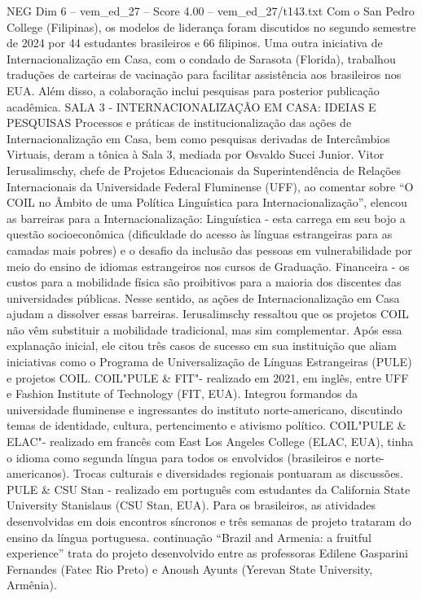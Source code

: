 \begin{textsample}{NEG Dim 6 – vem\_ed\_27 – Score 4.00 – vem\_ed\_27/t143.txt}
Com o San Pedro College (Filipinas), os modelos de liderança foram discutidos no segundo semestre de 2024 por 44 estudantes brasileiros e 66 filipinos.
Uma outra iniciativa de Internacionalização em Casa, com o condado de Sarasota (Florida), trabalhou traduções de carteiras de vacinação para facilitar assistência aos brasileiros nos EUA.
Além disso, a colaboração inclui pesquisas para posterior publicação acadêmica.
SALA 3 - INTERNACIONALIZAÇÃO EM CASA: IDEIAS E PESQUISAS Processos e práticas de institucionalização das ações de Internacionalização em Casa, bem como pesquisas derivadas de Intercâmbios Virtuais, deram a tônica à Sala 3, mediada por Osvaldo Succi Junior.
Vitor Ierusalimschy, chefe de Projetos Educacionais da Superintendência de Relações Internacionais da Universidade Federal Fluminense (UFF), ao comentar sobre “O COIL no Âmbito de uma Política Linguística para Internacionalização”, elencou as barreiras para a Internacionalização: Linguística - esta carrega em seu bojo a questão socioeconômica (dificuldade do acesso às línguas estrangeiras para as camadas mais pobres) e o desafio da inclusão das pessoas em vulnerabilidade por meio do ensino de idiomas estrangeiros nos cursos de Graduação.
Financeira - os custos para a mobilidade física são proibitivos para a maioria dos discentes das universidades públicas.
Nesse sentido, as ações de Internacionalização em Casa ajudam a dissolver essas barreiras.
Ierusalimschy ressaltou que os projetos COIL não vêm substituir a mobilidade tradicional, mas sim complementar.
Após essa explanação inicial, ele citou três casos de sucesso em sua instituição que aliam iniciativas como o Programa de Universalização de Línguas Estrangeiras (PULE) e projetos COIL.
COIL"PULE \& FIT"- realizado em 2021, em inglês, entre UFF e Fashion Institute of Technology (FIT, EUA).
Integrou formandos da universidade fluminense e ingressantes do instituto norte-americano, discutindo temas de identidade, cultura, pertencimento e ativismo político.
COIL"PULE \& ELAC"- realizado em francês com East Los Angeles College (ELAC, EUA), tinha o idioma como segunda língua para todos os envolvidos (brasileiros e norte-americanos).
Trocas culturais e diversidades regionais pontuaram as discussões.
PULE \& CSU Stan - realizado em português com estudantes da California State University Stanislaus (CSU Stan, EUA).
Para os brasileiros, as atividades desenvolvidas em dois encontros síncronos e três semanas de projeto trataram do ensino da língua portuguesa. continuação “Brazil and Armenia: a fruitful experience” trata do projeto desenvolvido entre as professoras Edilene Gasparini Fernandes (Fatec Rio Preto) e Anoush Ayunts (Yerevan State University, Armênia).

\end{textsample}
